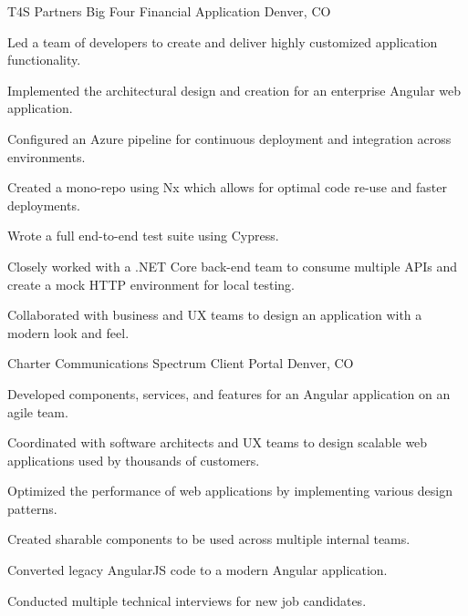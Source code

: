 \begin{cventries}
    \cventry
    {T4S Partners} %
    {Big Four Financial Application} %
    {Denver, CO} %
    {} %
    {
    \begin{cvitems} %
        \item {Led a team of developers to create and deliver highly customized application functionality.}
        \item {Implemented the architectural design and creation for an enterprise Angular web application.}
        \item {Configured an Azure pipeline for continuous deployment and integration across environments.}
        \item {Created a mono-repo using Nx which allows for optimal code re-use and faster deployments.}
        \item {Wrote a full end-to-end test suite using Cypress.}
        \item {Closely worked with a .NET Core back-end team to consume multiple APIs and create a mock HTTP environment for local testing.}
        \item {Collaborated with business and UX teams to design an application with a modern look and feel.}
    \end{cvitems}
    }

    \cventry
    {Charter Communications} %
    {Spectrum Client Portal} %
    {Denver, CO} %
    {} %
    {
    \begin{cvitems} %
        \item {Developed components, services, and features for an Angular application on an agile team.}
        \item {Coordinated with software architects and UX teams to design scalable web applications used by thousands of customers.}
        \item {Optimized the performance of web applications by implementing various design patterns.}
        \item {Created sharable components to be used across multiple internal teams.}
        \item {Converted legacy AngularJS code to a modern Angular application.}
        \item {Conducted multiple technical interviews for new job candidates.}
    \end{cvitems}
    }


\end{cventries}
